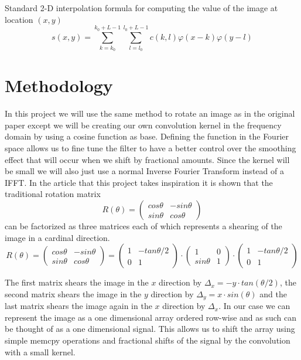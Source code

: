 \documentclass[]{usiinfbachelorproject}
\begin{document}
	Standard 2-D interpolation formula for computing the value of the image at location $(x,y)$
	\begin{equation}
		s(x,y) = \sum_{k = k_0}^{k_0+L-1}\sum_{l=l_0}^{l_0+L-1} c(k,l)\varphi(x-k)\varphi(y-l)
	\end{equation}
	
	\fi
	

	\section{Methodology}	
		In this project we will use the same method to rotate an image as in the original paper \cite{main_article} except we will be creating our own convolution kernel in the frequency domain by using a cosine function as base. Defining the function in the Fourier space allows us to fine tune the filter to have a better control over the smoothing effect that will occur when we shift by fractional amounts. Since the kernel will be small we will also just use a normal Inverse Fourier Transform instead of a IFFT. In the article that this project takes inspiration it is shown that the traditional rotation matrix
	\begin{equation*}
		R(\theta) = 
		\begin{pmatrix}
			cos\theta & -sin\theta\\
			sin\theta & cos\theta
		\end{pmatrix}
	\end{equation*} 
	can be factorized as three matrices each of which represents a shearing of the image in a cardinal direction.
	\begin{equation*}
		R(\theta) = 
		\begin{pmatrix}
			cos\theta & -sin\theta\\
			sin\theta & cos\theta
		\end{pmatrix}
		=
		\begin{pmatrix}
			1 & -tan\theta/2\\
			0 & 1
		\end{pmatrix}
		\cdot
		\begin{pmatrix}
			1 & 0\\
			sin\theta & 1
		\end{pmatrix}
		\cdot
		\begin{pmatrix}
			1 & -tan\theta/2\\
			0 & 1
		\end{pmatrix}
	\end{equation*} 
	
	The first matrix shears the image in the $x$ direction by $\Delta_x = -y\cdot tan(\theta/2)$, the second matrix shears the image in the $y$ direction by $\Delta_y = x \cdot sin(\theta)$ and the last matrix shears the image again in the $x$ direction by $\Delta_x$.
	In our case we can represent the image as a one dimensional array ordered row-wise and as such can be thought of as a one dimensional signal. This allows us to shift the array using simple memcpy operations and fractional shifts of the signal by the convolution with a small kernel.
	
\end{document}

